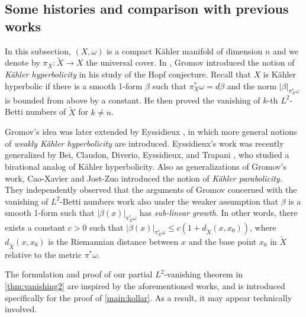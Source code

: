 \documentclass[11pt,a4paper,english]{smfart}
\theoremstyle{plain}
\theoremstyle{definition}
\theoremstyle{plain}
\begin{document}
	
	\subsection{Some histories and comparison with previous works}
	In this subsection, $(X,\omega)$ is a compact K\"ahler manifold of dimension $n$ and we denote by $\pi_X:\widetilde{X}\to X$  the universal cover.  In \cite{Gr}, Gromov introduced the notion of \emph{K\"ahler hyperbolicity} in his study of the Hopf conjecture. Recall that  $X$ is K\"ahler hyperbolic if there is a smooth 1-form $\beta$ such that $\pi_X^*\omega=d\beta$ and the norm $|\beta|_{\pi_X^*\omega}$ is bounded from above by a constant.   He then proved the vanishing of $k$-th $L^2$-Betti numbers of $\widetilde{X}$  for $k\neq n$. 
	
	
	Gromov's idea was later extended by Eyssidieux \cite{Esy97}, in which  more general notions  of \emph{weakly K\"ahler hyperbolicity} are introduced.   Eyssidieux's  work was recently generalized by {Bei}, Claudon, {Diverio}, {Eyssidieux}, and {Trapani} \cite{BDET22,BCDT24}, who studied a {birational} analog of {K\"ahler hyperbolicity}. 
 Also as generalizations of Gromov's work,   Cao-Xavier \cite{CX} and Jost-Zuo \cite{JZ}   introduced the notion of \emph{K\"ahler parabolicity}. They independently observed that the arguments of Gromov concerned with the vanishing of $L^2$-Betti numbers work also under the weaker assumption that  $\beta$ is a smooth 1-form such that $|\beta(x)|_{\pi_X^*\omega}$  has \emph{sub-linear growth}. In other words,   there exists a constant $c>0$ such that  $|\beta(x)|_{\pi_X^*\omega}\leq c(1+d_{\widetilde{X}}(x,x_0))$, where $d_{\widetilde{X}}(x,x_0)$ is the Riemannian distance between $x$ and the base point $x_0$ in $\widetilde{X}$ relative to the metric $\pi^*\omega$.   %
	
The formulation and proof of our partial $L^2$-vanishing theorem in  \cref{thm:vanishing2}  are inspired by the aforementioned works, and is introduced specifically for the proof of \cref{main:kollar}.  As a result, it may appear technically involved.  
	
\end{document}
